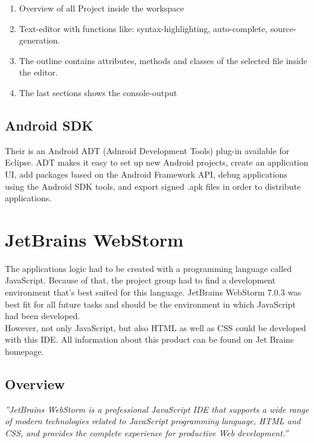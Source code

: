 \begin{enumerate}
\item Overview of all Project inside the workspace
\item Text-editor with functions like: syntax-highlighting, auto-complete, source-generation.
\item The outline contains attributes, methods and classes of the selected file inside the editor. 
\item The last sections shows the console-output     
\end{enumerate}

\subsection{Android SDK}
Their is an Android ADT (Adnroid Development Tools) plug-in available for Eclipse. ADT makes it easy to set up new Android projects, create an application UI, add packages based on the Android Framework API, debug applications using the Android SDK tools, and export signed .apk files in order to distribute  applications.














\section{JetBrains WebStorm}
The applications logic had to be created with a programming language called JavaScript. Because of that, the project group had to find a development environment that's best suited for this language. JetBrains WebStorm 7.0.3 was best fit for all future tasks and should be the environment in which JavaScript had been developed. 
\\

However, not only JavaScript, but also HTML as well as CSS could be developed with this IDE. All information about this product can be found on Jet Brains homepage.\cite{webstorm}
\subsection{Overview}
\textit{''JetBrains WebStorm is a professional JavaScript IDE that supports a wide range of modern technologies related to JavaScript programming language, HTML and  CSS, and provides the complete experience for productive Web development.''}\cite{webstorm}
\\

